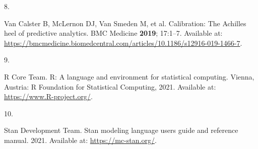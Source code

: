 \documentclass[
  12pt,
]{article}
\newlength{\cslhangindent}
\newlength{\csllabelwidth}
\newlength{\cslentryspacingunit} %
\newenvironment{CSLReferences}[2] %
 {%
  \setlength{\parindent}{0pt}
  \ifodd #1
  \let\oldpar\par
  \def\par{\hangindent=\cslhangindent\oldpar}
  \fi
  \setlength{\parskip}{#2\cslentryspacingunit}
 }%
 {}
\newcommand{\CSLLeftMargin}[1]{\parbox[t]{\csllabelwidth}{#1}}
\newcommand{\CSLRightInline}[1]{\parbox[t]{\linewidth - \csllabelwidth}{#1}\break}
\begin{document}
\begin{CSLReferences}{0}{0}
\leavevmode{}%
\CSLLeftMargin{8. }
\CSLRightInline{Van Calster B, McLernon DJ, Van Smeden M, et al. {Calibration: The Achilles heel of predictive analytics}. BMC Medicine \textbf{2019}; 17:1--7. Available at: \url{https://bmcmedicine.biomedcentral.com/articles/10.1186/s12916-019-1466-7}.}

\leavevmode{}%
\CSLLeftMargin{9. }
\CSLRightInline{R Core Team. R: A language and environment for statistical computing. Vienna, Austria: R Foundation for Statistical Computing, 2021. Available at: \url{https://www.R-project.org/}.}

\leavevmode{}%
\CSLLeftMargin{10. }
\CSLRightInline{Stan Development Team. Stan modeling language users guide and reference manual. 2021. Available at: \url{https://mc-stan.org/}.}

\end{CSLReferences}

\newpage

\singlespacing
\providecommand{\docline}[3]{\noalign{\global\setlength{\arrayrulewidth}{#1}}\arrayrulecolor[HTML]{#2}\cline{#3}}

\setlength{\tabcolsep}{2pt}

\renewcommand*{\arraystretch}{1.5}
\end{document}
